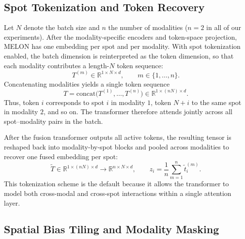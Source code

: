 \documentclass{article}
\theoremstyle{plain}
\theoremstyle{definition}
\begin{document}
\subsection{Spot Tokenization and Token Recovery}\label{app:impl-token}

Let $N$ denote the batch size and $n$ the number of modalities ($n = 2$ in all of our experiments). After the modality-specific encoders and token-space projection, MELON has one embedding per spot and per modality. With spot tokenization enabled, the batch dimension is reinterpreted as the token dimension, so that each modality contributes a length-$N$ token sequence:
\begin{equation}
  T^{(m)} \in \mathbb{R}^{1 \times N \times d}, \qquad m \in \{1, \ldots, n\}.
\end{equation}
Concatenating modalities yields a single token sequence
\begin{equation}
  T = \mathrm{concat}\bigl(T^{(1)}, \ldots, T^{(n)}\bigr) \in \mathbb{R}^{1 \times (nN) \times d}.
\end{equation}
Thus, token $i$ corresponds to spot $i$ in modality $1$, token $N+i$ to the same spot in modality $2$, and so on. The transformer therefore attends jointly across all spot--modality pairs in the batch.

After the fusion transformer outputs all active tokens, the resulting tensor is reshaped back into modality-by-spot blocks and pooled across modalities to recover one fused embedding per spot:
\begin{equation}
  \tilde{T} \in \mathbb{R}^{1 \times (nN) \times d}
  \rightarrow
  \mathbb{R}^{n \times N \times d},
  \qquad
  z_i = \frac{1}{n}\sum_{m=1}^{n} \tilde{t}^{(m)}_i.
\end{equation}
This tokenization scheme is the default because it allows the transformer to model both cross-modal and cross-spot interactions within a single attention layer.

\subsection{Spatial Bias Tiling and Modality Masking}\label{app:impl-bias}
\end{document}
